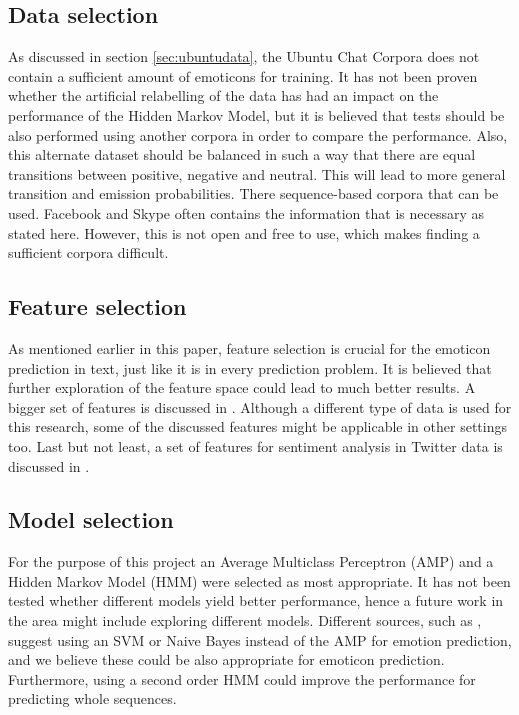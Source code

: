 \subsection{Data selection}
As discussed in section \ref{sec:ubuntudata}, the Ubuntu Chat Corpora does not contain a sufficient amount of emoticons for training. It has not been proven whether the artificial relabelling of the data has had an impact on the performance of the Hidden Markov Model, but it is believed that tests should be also performed using another corpora in order to compare the performance. Also, this alternate dataset should be balanced in such a way that there are equal transitions between positive, negative and neutral. This will lead to more general transition and emission probabilities. There sequence-based corpora that can be used. Facebook and Skype often contains the information that is necessary as stated here. However, this is not open and free to use, which makes finding a sufficient corpora difficult. %

\subsection{Feature selection}

As mentioned earlier in this paper, feature selection is crucial for the emoticon prediction in text, just like it is in every prediction problem. It is believed that further exploration of the feature space could lead to much better results. A bigger set of features is discussed in \cite{fairytales}. Although a different type of data is used for this research, some of the discussed features might be applicable in other settings too. Last but not least, a set of features for sentiment analysis in Twitter data is discussed in \cite{twittersentiment}.

\subsection{Model selection}

For the purpose of this project an Average Multiclass Perceptron (AMP) and a Hidden Markov Model (HMM) were selected as most appropriate. It has not been tested whether different models yield better performance, hence a future work in the area might include exploring different models. Different sources, such as \cite{emotionclassifiers}, suggest using an SVM or Naive Bayes instead of the AMP for emotion prediction, and we believe these could be also appropriate for emoticon prediction. Furthermore, using a second order HMM could improve the performance for predicting whole sequences.
